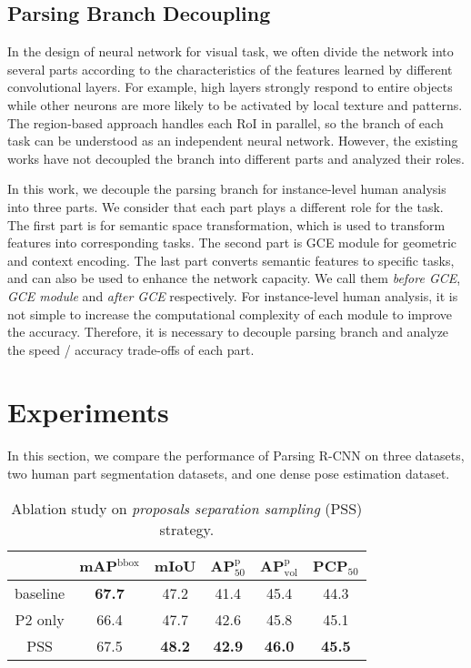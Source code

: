 \documentclass[10pt,twocolumn,letterpaper]{article}
\begin{document}
\subsection{Parsing Branch Decoupling}
In the design of neural network for visual task, we often divide the network into several parts according to the characteristics of the features learned by different convolutional layers. For example, high layers strongly respond to entire objects while other neurons are more likely to be activated by local texture and patterns. The region-based approach handles each RoI in parallel, so the branch of each task can be understood as an independent neural network. However, the existing works have not decoupled the branch into different parts and analyzed their roles.

In this work, we decouple the parsing branch for instance-level human analysis into three parts. We consider that each part plays a different role for the task. The first part is for semantic space transformation, which is used to transform features into corresponding tasks. The second part is GCE module for geometric and context encoding. The last part converts semantic features to specific tasks, and can also be used to enhance the network capacity. We call them \emph{before GCE}, \emph{GCE module} and \emph{after GCE} respectively. For instance-level human analysis, it is not simple to increase the computational complexity of each module to improve the accuracy. Therefore, it is necessary to decouple parsing branch and analyze the speed / accuracy trade-offs of each part. 


\section{Experiments}
\label{sec:exper}

In this section, we compare the performance of Parsing R-CNN on three datasets, two human part segmentation datasets, and one dense pose estimation dataset.

\begin{table}[t]
\centering
\small
\begin{tabular}{c|c|cccc}
& mAP$^\text{bbox}$  & mIoU  &  AP$^\text{p}_\text{50}$ & AP$^\text{p}_\text{vol}$  & PCP$_\text{50}$ \\
 \toprule[0.2em]
baseline & \textbf{67.7}  &47.2  & 41.4 & 45.4 & 44.3 \\
P2 only  & 66.4  & 47.7 & 42.6 & 45.8 & 45.1 \\
PSS       & 67.5  &  \textbf{48.2} &  \textbf{42.9}  &  \textbf{46.0}  &  \textbf{45.5}  \\

\end{tabular}
\vspace{.5em}
  \caption{Ablation study on \emph{proposals separation sampling} (PSS) strategy.}
  \label{tab:ablation_pss}
\vspace{-.8em}
\end{table}
\end{document}
